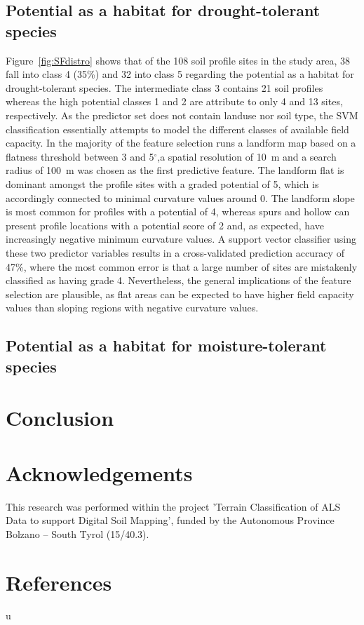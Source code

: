 \documentclass[preprint,12pt,authoryear]{elsarticle}
\begin{document}
\subsection{Potential as a habitat for drought-tolerant species}
Figure~\ref{fig:SFdistro} shows that of the 108 soil profile sites in the study area, 38 fall into class 4 (35\%) and 32 into class 5 regarding the potential as a habitat for drought-tolerant species. The intermediate class 3 contains 21 soil profiles whereas the high potential classes 1 and 2 are attribute to only 4 and 13 sites, respectively. 
As the predictor set does not contain landuse nor soil type, the SVM classification essentially attempts to model the different classes of available field capacity. In the majority of the feature selection runs a landform map based on a flatness threshold between 3 and 5$^{\circ}$,a spatial resolution of 10~m and a search radius of 100~m was chosen as the first predictive feature. The landform flat is dominant amongst the profile sites with a graded potential of 5, which is accordingly connected to minimal curvature values around 0. The landform slope is  most common for profiles with a potential  of 4, whereas spurs and hollow can present profile locations with a  potential score of 2 and, as expected, have increasingly negative minimum curvature values. A support vector classifier using these two predictor variables results in a cross-validated prediction accuracy of 47\%, where the most common error is that  a large number of sites are mistakenly classified as having grade 4. Nevertheless, the general implications of the feature selection are plausible, as flat areas  can  be expected to have higher field capacity values than sloping regions with negative curvature values.
\subsection{Potential as a habitat for moisture-tolerant species}
\section{Conclusion}
 

\section*{Acknowledgements} This research was performed within the project 'Terrain Classification of ALS Data to support Digital Soil Mapping', funded by the Autonomous Province Bolzano -- South Tyrol (15/40.3).

\section*{References}
u
\end{document}
